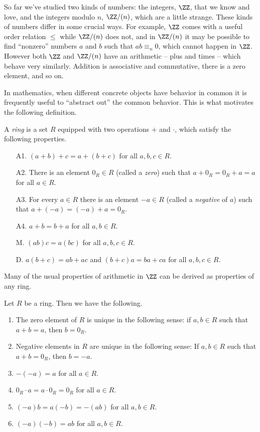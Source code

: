 \documentclass{article}
\begin{document}

So far we've studied two kinds of numbers: the integers, $\ZZ$, that we know and love, and the integers modulo $n$, $\ZZ/(n)$, which are a little strange. These kinds of numbers differ in some crucial ways. For example, $\ZZ$ comes with a useful order relation $\leq$ while $\ZZ/(n)$ does not, and in $\ZZ/(n)$ it may be possible to find ``nonzero'' numbers $a$ and $b$ such that $ab \equiv_n 0$, which cannot happen in $\ZZ$. However both $\ZZ$ and $\ZZ/(n)$ have an arithmetic -- plus and times -- which behave very similarly. Addition is associative and commutative, there is a zero element, and so on.

In mathematics, when different concrete objects have behavior in common it is frequently useful to ``abstract out'' the common behavior. This is what motivates the following definition.

\begin{dfn}[Ring] \label{dfn:ring}
A \emph{ring} is a set $R$ equipped with two operations $+$ and $\cdot$, which satisfy the following properties.
\begin{itemize}
\item[A1.] $(a+b)+c = a+(b+c)$ for all $a,b,c \in R$.
\item[A2.] There is an element $0_R \in R$ (called a \emph{zero}) such that $a+0_R = 0_R+a = a$ for all $a \in R$.
\item[A3.] For every $a \in R$ there is an element $-a \in R$ (called a \emph{negative} of $a$) such that $a+(-a) = (-a)+a = 0_R$.
\item[A4.] $a + b = b + a$ for all $a,b \in R$.
\item[M.] $(ab)c = a(bc)$ for all $a,b,c \in R$.
\item[D.] $a(b+c) = ab + ac$ and $(b+c)a = ba + ca$ for all $a,b,c \in R$.
\end{itemize}
\end{dfn}

Many of the usual properties of arithmetic in $\ZZ$ can be derived as properties of any ring.

\begin{prop}
Let $R$ be a ring. Then we have the following.
\begin{enumerate}
\item The zero element of $R$ is unique in the following sense: if $a,b \in R$ such that $a+b = a$, then $b = 0_R$.
\item Negative elements in $R$ are unique in the following sense: If $a,b \in R$ such that $a+b = 0_R$, then $b = -a$.
\item $-(-a) = a$ for all $a \in R$.
\item $0_R \cdot a = a \cdot 0_R = 0_R$ for all $a \in R$.
\item $(-a)b = a(-b) = -(ab)$ for all $a,b \in R$.
\item $(-a)(-b) = ab$ for all $a,b \in R$.
\end{enumerate}
\end{prop}
\end{document}
